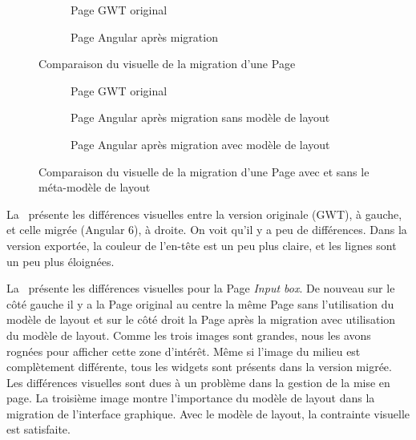 \documentclass[a4paper]{article}
\begin{document}
\begin{figure}[htbp]
  \begin{subfigure}{0.49\textwidth}
    \caption{Page GWT original} 
    \label{fig:cmp1a}
  \end{subfigure}
  \hfill %
  \begin{subfigure}{0.49\textwidth}
    \caption{Page Angular après migration} 
    \label{fig:cmp1b}
  \end{subfigure}
  \caption{Comparaison du visuelle de la migration d'une Page} 
  \label{fig:cmp1}
\end{figure}

\begin{figure*}[hbtp]
  \begin{subfigure}{0.30\textwidth}
    \caption{Page GWT original} \label{fig:cmp2a}
  \end{subfigure}
  \hspace*{\fill} %
  \begin{subfigure}{0.30\textwidth}
    \caption{Page Angular après migration sans modèle de layout} 
    \label{fig:cmp2b}
  \end{subfigure}
  \hspace*{\fill} %
  \begin{subfigure}{0.30\textwidth}
    \caption{Page Angular après migration avec modèle de layout} 
    \label{fig:cmp2c}
  \end{subfigure}
  \caption{Comparaison du visuelle de la migration d'une Page avec et sans le méta-modèle de layout} 
  \label{fig:cmp2}
\end{figure*}

La~ présente les différences visuelles entre la version originale (GWT), à gauche, 
  et celle migrée (Angular 6), à droite.
On voit qu'il y a peu de différences. 
Dans la version exportée, la couleur de l'en-tête est un peu plus claire,
et les lignes sont un peu plus éloignées.

La~ présente les différences visuelles pour la Page \textit{Input box}. 
De nouveau sur le côté gauche il y a la Page original 
  au centre la même Page sans l'utilisation du modèle de layout
  et sur le côté droit la Page après la migration avec utilisation du modèle de layout. 
Comme les trois images sont grandes, nous les avons rognées pour afficher cette zone d'intérêt. 
Même si l'image du milieu est complètement différente, tous les widgets sont présents dans la version migrée.
Les différences visuelles sont dues à un problème dans la gestion de la mise en page.
La troisième image montre l'importance du modèle de layout dans la migration de l'interface graphique.
Avec le modèle de layout, la contrainte visuelle est satisfaite.
\end{document}
